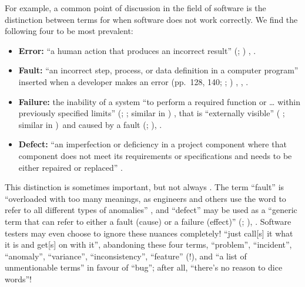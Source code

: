 For example, a common point of discussion in the field of software is the
distinction between terms for when software does not work correctly. We find
the following four to be most prevalent:
\begin{itemize}
    \item \textbf{Error:} ``a human action that produces an incorrect result''
          \ifnotpaper (\citealp[p.~128]{IEEE2010};
              \citealp[p.~399]{vanVliet2000})\else
              \cite[p.~128]{IEEE2010}, \cite[p.~399]{vanVliet2000}\fi.
    \item \textbf{Fault:} ``an incorrect step, process, or data definition in a
          computer program'' \citep[p.~140]{IEEE2010} inserted when a developer
          makes an error \ifnotpaper (pp.~128, 140; \citealp[p.~12\=/3]{SWEBOK2024};
              \citealp[pp.~399--400]{vanVliet2000})\else
              \cite[pp.~128, 140]{IEEE2010}, \cite[pp.~399--400]{vanVliet2000},
              \cite[p.~12\=/3]{SWEBOK2024}\fi.
    \item \textbf{Failure:} the inability of a system ``to perform a required
          function or \dots{} within previously specified limits'' \ifnotpaper
              (\citealp[p.~7]{IEEE2019}; \citeyear[p.~139]{IEEE2010}; similar in \citealp[p.~400]{vanVliet2000})
          \else \cite[p.~139]{IEEE2010}, \cite[p.~7]{IEEE2019} \fi that is
          ``externally visible'' \ifnotpaper(\fi\citealp[p.~7]{IEEE2019}%
          \ifnotpaper; similar in \citealp[p.~400]{vanVliet2000})\fi\
          and caused by a fault \ifnotpaper (\citealp[p.~12\=/3]{SWEBOK2024};
              \citealp[p.~400]{vanVliet2000})\else \cite[p.~400]{vanVliet2000},
              \cite[p.~12\=/3]{SWEBOK2024}\fi.
    \item \textbf{Defect:} ``an imperfection or deficiency in a project
          component where that component does not meet its requirements or
          specifications and needs to be either repaired or replaced''
          \citep[p.~96]{IEEE2010}.
\end{itemize}
This distinction is sometimes important, but not always
\citep[p.~4\=/3]{SWEBOK2014}. The term ``fault'' is
``overloaded with too many meanings, as engineers and others use the word to
refer to all different types of anomalies'' \citep[p.~12\=/3]{SWEBOK2024}, and
``defect'' may be used as a ``generic term that can refer to either a fault
(cause) or a failure (effect)'' \ifnotpaper (\citealp[p.~124]{IEEE2017};
    \citeyear[p.~96]{IEEE2010}\todo{OG 2005})\else \cite[p.~96]{IEEE2010},
    \cite[p.~124]{IEEE2017}\fi. Software testers may even choose to ignore
these nuances completely! \citet[pp.~13\==14]{Patton2006} ``just call[s] it
what it is and get[s] on with it'', abandoning these four terms, %
``problem'', ``incident'', ``anomaly'', ``variance'', ``inconsistency'',
``feature'' (!), and ``a list of unmentionable terms'' in favour of ``bug'';
after all, ``there's no reason to dice words''!


